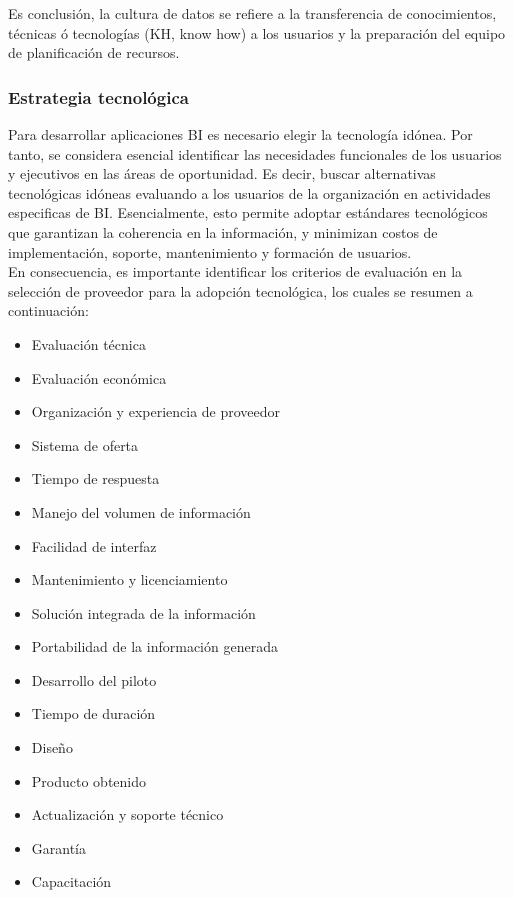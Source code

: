 \documentclass[11pt,titlepage]{report}
\begin{document}
Es conclusión, la cultura de datos se refiere a la transferencia de conocimientos, técnicas ó tecnologías (KH, know how) a los usuarios y la preparación del equipo de planificación de recursos.


\subsubsection{Estrategia tecnológica} 
Para desarrollar aplicaciones BI es necesario elegir la tecnología idónea. Por tanto, se considera esencial identificar las necesidades funcionales de los usuarios y ejecutivos en las áreas de oportunidad. Es decir, buscar alternativas tecnológicas idóneas evaluando a los usuarios de la organización en actividades especificas de BI. Esencialmente, esto permite adoptar estándares tecnológicos que garantizan la coherencia en la información, y minimizan costos de implementación, soporte, mantenimiento y formación de usuarios.\\

En consecuencia, es importante identificar los criterios de evaluación en la selección de proveedor para la adopción tecnológica, los cuales se resumen a continuación:

\begin{multicols}{3}
\begin{itemize}
\item Evaluación técnica
\item Evaluación económica
\item Organización y experiencia de proveedor
\item Sistema de oferta
\item Tiempo de respuesta
\item Manejo del volumen de información
\item Facilidad de interfaz
\item Mantenimiento y licenciamiento
\item Solución integrada de la información
\item Portabilidad de la información generada
\item Desarrollo del piloto
\item Tiempo de duración
\item Diseño
\item Producto obtenido
\item Actualización y soporte técnico
\item Garantía 
\item Capacitación
\end{itemize}
\end{multicols}	
\end{document}
